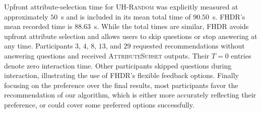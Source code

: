 \documentclass[conference]{IEEEtran}
\theoremstyle{definition}
\theoremstyle{plain}
\begin{document}
Upfront attribute-selection time for \textsc{UH-Random} was explicitly measured at approximately $50$~s and is included in its mean total time of $90.50$~s. FHDR’s mean recorded time is $88.63$~s. While the total times are similar, FHDR avoids upfront attribute selection and allows users to skip questions or stop answering at any time. Participants $3$, $4$, $8$, $13$, and $29$ requested recommendations without answering questions and received \textsc{AttributeSubset} outputs. Their $T=0$ entries denote zero interaction time. Other participants skipped questions during interaction, illustrating the use of FHDR’s flexible feedback options. Finally focusing on the preference over the final results, most participants favor the recommendation of our algorithm, which is either more accurately reflecting their preference, or could cover some preferred options successfully.


\end{document}
